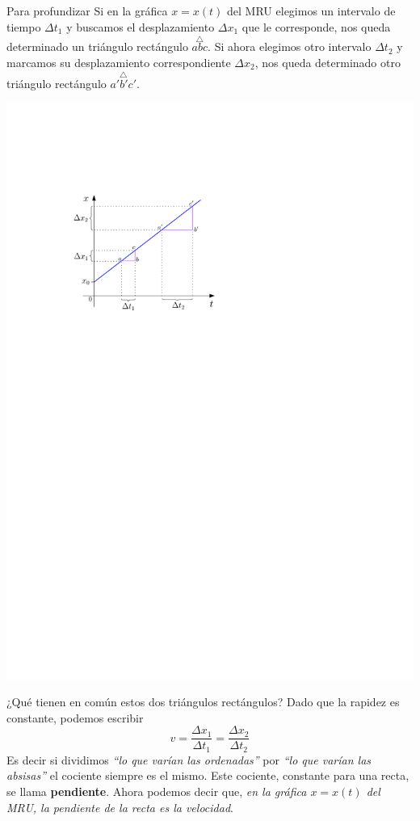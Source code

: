 \begin{mybox}{Para profundizar}
  Si en la gráfica $x=x(t)$ del MRU elegimos un intervalo de tiempo $\Delta t_1$ y buscamos el desplazamiento $\Delta x_1$ que le corresponde, nos queda determinado un triángulo rectángulo $\overset{\triangle}{abc}$. Si ahora elegimos otro intervalo $\Delta t_2$ y marcamos su desplazamiento correspondiente $\Delta x_2$, nos queda determinado otro triángulo rectángulo $\overset{\triangle}{a'b'c'}$.
 \begin{center}
    \includegraphics[scale=1]{img/MRU_intervalos.pdf}
  \end{center}
  ¿Qué tienen en común estos dos triángulos rectángulos? Dado que la rapidez es constante, podemos escribir
  $$v=\frac{\Delta x_1}{\Delta t_1}=\frac{\Delta x_2}{\Delta t_2}$$
  Es decir si dividimos {\it ``lo que varían las ordenadas''} por {\it ``lo que varían las absisas''} el cociente siempre es el mismo. Este cociente, constante para una recta, se llama {\bf pendiente}. Ahora podemos decir que, {\em en la gráfica $x=x(t)$ del MRU, la pendiente de la recta es la velocidad}.
\end{mybox}

